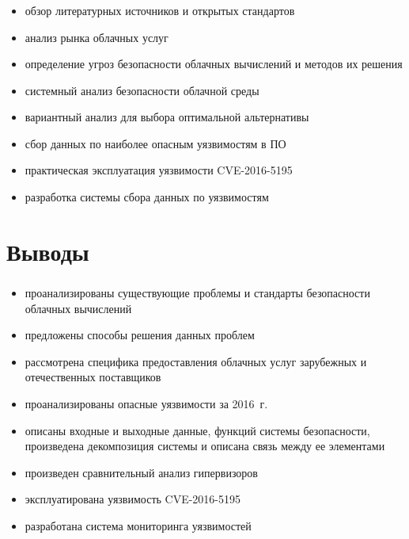 \begin{frame}
\frametitle{\insertsection}

\begin{itemize}
    \item обзор литературных источников и открытых стандартов
    \item анализ рынка облачных услуг
    \item определение угроз безопасности облачных вычислений и методов их решения
    \item системный анализ безопасности облачной среды
    \item вариантный анализ для выбора оптимальной альтернативы
    \item сбор данных по наиболее опасным уязвимостям в ПО
    \item практическая эксплуатация уязвимости CVE-2016-5195
    \item разработка системы сбора данных по уязвимостям
\end{itemize}
\end{frame}


\section{Выводы}

\begin{frame}
\frametitle{\insertsection}

\begin{itemize}
    \item проанализированы существующие проблемы и стандарты безопасности облачных вычислений
    \item предложены способы решения данных проблем
    \item рассмотрена специфика предоставления облачных услуг зарубежных и отечественных поставщиков
    \item проанализированы опасные уязвимости за 2016~г.
    \item описаны входные и выходные данные, функций системы безопасности, произведена декомпозиция системы и описана связь между ее элементами
    \item произведен сравнительный анализ гипервизоров
    \item эксплуатирована уязвимость CVE-2016-5195
    \item разработана система мониторинга уязвимостей
\end{itemize}
\end{frame}

